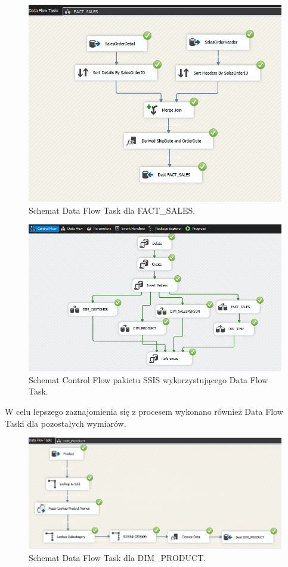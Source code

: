 \documentclass[a4paper,12pt]{article}
\begin{document}
\begin{figure}[H]
    \centering
    \includegraphics[width=\textwidth]{images/5_sales.png}
    \caption{Schemat Data Flow Task dla FACT\_SALES.}
\end{figure}

\begin{figure}[H]
    \centering
    \includegraphics[width=\textwidth]{images/5_schema.png}
    \caption{Schemat Control Flow pakietu SSIS wykorzystującego Data Flow Task.}
    \label{fig:zad5_control_flow}
\end{figure}

W celu lepszego zaznajomienia się z procesem wykonano również Data Flow Taski dla pozostałych wymiarów.

\begin{figure}[H]
    \centering
    \includegraphics[width=\textwidth]{images/5_product.png}
    \caption{Schemat Data Flow Task dla DIM\_PRODUCT.}
\end{figure}
\end{document}
